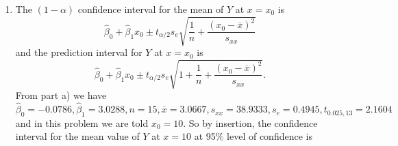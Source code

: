 \begin{derivation}
\begin{enumerate}[label=\alph*)]
\begin{equation*}
          .\end{equation*}
          $s_e$ is found using Matlab to be
          \begin{equation*}
            s_e = \sqrt{\frac{\num{3,1783} }{13}} = \num{0,4945} 
          .\end{equation*}
          For a 95\% CI, $\alpha = \num{0,05}$ and we have $n - 2 = 15 - 2 = 13$ degrees of freedom, so we use $t_{\num{0,025}, 13 } = \num{2,1604}$.
          Then, the 95\% CI for the coefficients $\beta_0$ and $\beta_1$ is
          \begin{align*}
            \text{CI}_{\beta_{0}, 95\%} &= \hat{\beta}_0 \pm t_{\alpha / 2} s_e \sqrt{\frac{1}{n} + \frac{\overline{x}^2}{s_{x x}}} \\
              &= \num{-0,0786} \pm \num{2,16} \cdot \num{0,495} \sqrt{\frac{1}{15} + \frac{\num{3,0667}^2 }{\num{38,933} }}  \\
              &= [\num{-0.6722}; \num{0,515} ]\\
              \text{CI}_{\beta_1, 95\%} &= \hat{\beta}_1 \pm t_{\alpha / 2} s_e \frac{1}{\sqrt{s_{x x}}} \\
              &= \num{3,0288} \pm \num{2,16} \cdot \num{0,495} \cdot \frac{1}{\sqrt{\num{38,933} }}  \\
              &= [\num{2.857}; \num{3.200}]
          .\end{align*}
        \item The $(1-\alpha)$ confidence interval for the mean of $Y$ at $x = x_0$ is
          \begin{equation*}
            \hat{\beta}_0 + \hat{\beta}_1 x_0 \pm t_{\alpha / 2 } s_e \sqrt{\frac{1}{n} + \frac{(x_0 - \overline{x}) ^2}{s_{x x}}}
          \end{equation*}
          and the prediction interval for $Y$ at $x = x_0$ is
          \begin{equation*}
            \hat{\beta}_0 + \hat{\beta}_1 x_0 \pm t_{\alpha / 2 } s_e \sqrt{1 + \frac{1}{n} + \frac{(x_0 - \overline{x}) ^2}{s_{x x}}}
          .\end{equation*}
          From part a) we have $\hat{\beta}_0 = \num{-0,0786}, \hat{\beta}_1 = \num{3,0288}, n = 15, \overline{x} = \num{3,0667}, s_{x x} = \num{38,9333}, s_e = \num{0,4945}, t_{\num{0,025}, 13 } = \num{2,1604} $ and in this problem we are told $x_0 = 10$.
          So by insertion, the confidence interval for the mean value of $Y$ at $x = 10$ at 95\% level of confidence is
          \begin{equation*}

\end{equation*}
\end{enumerate}
\end{derivation}
